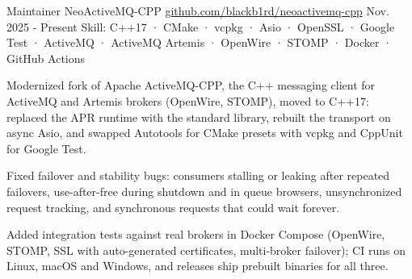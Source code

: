 \begin{cventries}
  \cventry
    {Maintainer} %
    {NeoActiveMQ-CPP} %
    {\href{https://github.com/blackb1rd/neoactivemq-cpp}{github.com/blackb1rd/neoactivemq-cpp}} %
    {Nov. 2025 - Present} %
    {Skill: C++17 · CMake · vcpkg · Asio · OpenSSL · Google Test · ActiveMQ · ActiveMQ Artemis · OpenWire · STOMP · Docker · GitHub Actions} %
    {
      \begin{cvitems} %
        \item {Modernized fork of Apache ActiveMQ-CPP, the C++ messaging client for ActiveMQ and Artemis brokers (OpenWire, STOMP), moved to C++17: replaced the APR runtime with the standard library, rebuilt the transport on async Asio, and swapped Autotools for CMake presets with vcpkg and CppUnit for Google Test.}
        \item {Fixed failover and stability bugs: consumers stalling or leaking after repeated failovers, use-after-free during shutdown and in queue browsers, unsynchronized request tracking, and synchronous requests that could wait forever.}
        \item {Added integration tests against real brokers in Docker Compose (OpenWire, STOMP, SSL with auto-generated certificates, multi-broker failover); CI runs on Linux, macOS and Windows, and releases ship prebuilt binaries for all three.}
      \end{cvitems}
    }

\end{cventries}
